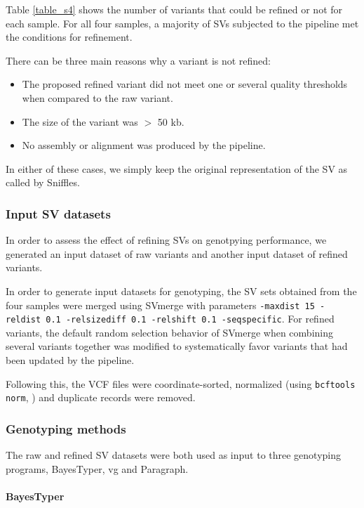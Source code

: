 \documentclass[12pt]{article}
\begin{document}
Table \ref{table_s4} shows the number of variants that could be refined or not for each sample.
For all four samples, a majority of SVs subjected to the pipeline met the conditions for refinement.

There can be three main reasons why a variant is not refined:

\begin{itemize}
	\item The proposed refined variant did not meet one or several quality thresholds when compared to the raw variant.
	\item The size of the variant was $>$ 50 kb.
	\item No assembly or alignment was produced by the pipeline.
\end{itemize}

In either of these cases, we simply keep the original representation of the SV as called by Sniffles.

\subsubsection{Input SV datasets}

In order to assess the effect of refining SVs on genotpying performance, we generated an input dataset of raw variants and another input dataset of refined variants.

In order to generate input datasets for genotyping, the SV sets obtained from the four samples were merged using SVmerge \citep{svmerge} with parameters \texttt{-maxdist 15 -reldist 0.1 -relsizediff 0.1 -relshift 0.1 -seqspecific}.
For refined variants, the default random selection behavior of SVmerge when combining several variants together was modified to systematically favor variants that had been updated by the pipeline.

Following this, the VCF files were coordinate-sorted, normalized (using \texttt{bcftools norm}, \cite{bcftools}) and duplicate records were removed.

\subsubsection{Genotyping methods}

The raw and refined SV datasets were both used as input to three genotyping programs, BayesTyper, vg and Paragraph.

\paragraph{BayesTyper}
\end{document}
